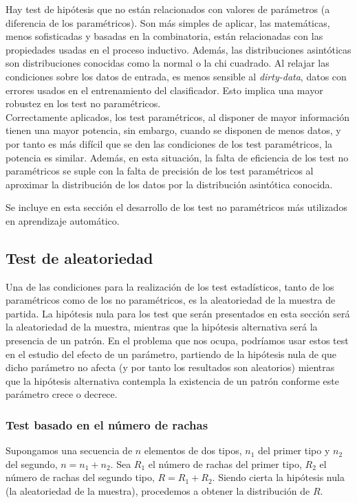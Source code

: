 	Hay test de hipótesis que no están relacionados con 
valores de parámetros (a diferencia de los paramétricos). Son 
más simples de aplicar, las matemáticas, menos sofisticadas y 
basadas en la combinatoria, están relacionadas con las 
propiedades usadas en el proceso inductivo. 
Además, las distribuciones asintóticas son 
distribuciones conocidas como la normal o la chi cuadrado. Al 
relajar las condiciones sobre los datos de entrada, es menos 
sensible al \textit{dirty-data}, datos con errores usados en 
el entrenamiento del clasificador. Esto implica una mayor 
robustez en los test no paramétricos.\\
 	
	Correctamente aplicados, los test paramétricos, al 
disponer de mayor información tienen una mayor potencia, sin 
embargo, cuando se disponen de menos datos, y por tanto es 
más difícil que se den las condiciones de los test 
paramétricos, la potencia es similar. Además, en esta 
situación, la falta de eficiencia de los test no paramétricos 
se suple con la falta de precisión de los test paramétricos 
al aproximar la distribución de los datos por la distribución 
asintótica conocida. 


 	Se incluye en esta sección el desarrollo de los test no
paramétricos más utilizados en aprendizaje automático.
 	
 	
\subsection{Test de aleatoriedad}

	Una de las condiciones para la realización de los test 
estadísticos, tanto de los paramétricos como de los no 
paramétricos, es la aleatoriedad de la muestra de partida. La 
hipótesis nula para los test que serán presentados en esta 
sección será la aleatoriedad de la muestra, mientras que la 
hipótesis alternativa será la presencia de un patrón. 
En el problema que nos ocupa, podríamos usar estos test 
en el estudio del efecto de un parámetro, partiendo de la
hipótesis nula de que dicho parámetro no afecta (y por tanto
los resultados son aleatorios) mientras que la hipótesis
alternativa contempla la existencia de un patrón conforme
este parámetro crece o decrece.

\subsubsection{Test basado en el número de rachas}

	Supongamos una secuencia de $n$ elementos de dos tipos, 
$n_1$ del primer tipo y $n_2$ del segundo, $n = n_1 + n_2$. 
Sea $R_1$ el número de rachas del primer tipo, $R_2$ el 
número de rachas del segundo tipo, $R = R_1 + R_2$. Siendo 
cierta la hipótesis nula (la aleatoriedad de la muestra), 
procedemos a obtener la distribución de $R$.
	
